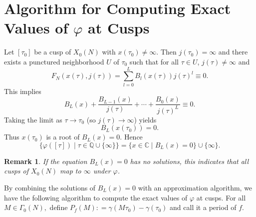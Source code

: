 \documentclass[10pt, a4paper]{article}
\newtheorem{remark}[theorem]{Remark}
\begin{document}
\section{Algorithm for Computing Exact Values of $\varphi$ at Cusps}

Let $[\tau_0]$ be a cusp of $X_0(N)$ with $x(\tau_0) \neq \infty$. Then
 $j(\tau_0) = \infty$ and
there exists a punctured neighborhood $U$ of $\tau_0$ such that for all $\tau \in U$,
  $j(\tau)\ne \infty$ and
    \[
    F_N(x(\tau), j(\tau)) = \sum_{l=0}^L B_l(x(\tau)) j(\tau)^l \equiv 0.
    \]
  This implies
    \[
    B_L(x) + \frac{B_{L-1}(x)}{j(\tau)} + \cdots + \frac{B_0(x)}{j(\tau)^L} \equiv 0.
    \]
Taking the limit as $\tau \to \tau_0$ (so $j(\tau) \to \infty$) yields
\[
B_L(x(\tau_0)) = 0.
\]
Thus $x(\tau_0)$ is a root of $B_L(x) = 0$.
Hence
\[
\{\varphi([\tau]) \mid \tau \in \mathbb{Q} \cup \{\infty\}\} = \{x \in \mathbb{C} \mid B_L(x) = 0\} \cup \{\infty\}.
\]
\begin{remark}
If the equation $B_L(x) = 0$ has no solutions, this indicates that all cusps of $X_0(N)$ map to $\infty$ under $\varphi$.
\end{remark}


By combining the solutions of $B_L(x) = 0$ with an approximation algorithm, we have the following algorithm to compute the exact values of $\varphi$ at cusps. For all $M \in {\Gamma _0}(N),$  define ${P_f}(M): = \gamma (M{\tau _0}) - \gamma ({\tau _0})$
and call it a period of $f$.
\end{document}
